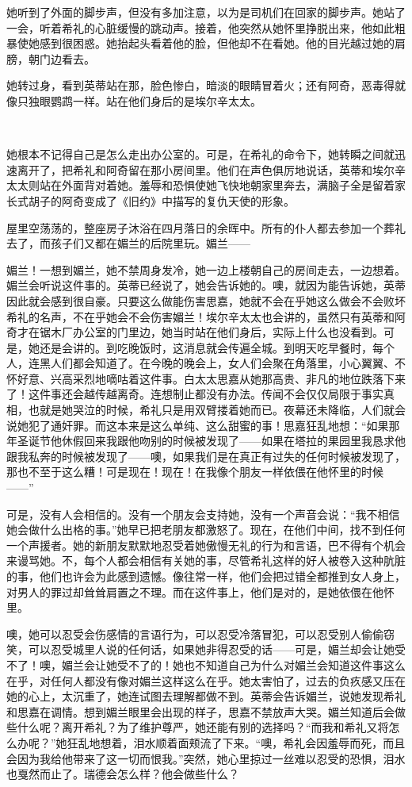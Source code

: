 \par 她听到了外面的脚步声，但没有多加注意，以为是司机们在回家的脚步声。她站了一会，听着希礼的心脏缓慢的跳动声。接着，他突然从她怀里挣脱出来，他如此粗暴使她感到很困惑。她抬起头看着他的脸，但他却不在看她。他的目光越过她的肩膀，朝门边看去。
\par 她转过身，看到英蒂站在那，脸色惨白，暗淡的眼睛冒着火；还有阿奇，恶毒得就像只独眼鹦鹉一样。站在他们身后的是埃尔辛太太。
\par  
\par 她根本不记得自己是怎么走出办公室的。可是，在希礼的命令下，她转瞬之间就迅速离开了，把希礼和阿奇留在那小房间里。他们在声色俱厉地说话，英蒂和埃尔辛太太则站在外面背对着她。羞辱和恐惧使她飞快地朝家里奔去，满脑子全是留着家长式胡子的阿奇变成了《旧约》中描写的复仇天使的形象。
\par 屋里空荡荡的，整座房子沐浴在四月落日的余晖中。所有的仆人都去参加一个葬礼去了，而孩子们又都在媚兰的后院里玩。媚兰——
\par 媚兰！一想到媚兰，她不禁周身发冷，她一边上楼朝自己的房间走去，一边想着。媚兰会听说这件事的。英蒂已经说了，她会告诉她的。噢，就因为能告诉她，英蒂因此就会感到很自豪。只要这么做能伤害思嘉，她就不会在乎她这么做会不会败坏希礼的名声，不在乎她会不会伤害媚兰！埃尔辛太太也会讲的，虽然只有英蒂和阿奇才在锯木厂办公室的门里边，她当时站在他们身后，实际上什么也没看到。可是，她还是会讲的。到吃晚饭时，这消息就会传遍全城。到明天吃早餐时，每个人，连黑人们都会知道了。在今晚的晚会上，女人们会聚在角落里，小心翼翼、不怀好意、兴高采烈地嘀咕着这件事。白太太思嘉从她那高贵、非凡的地位跌落下来了！这件事还会越传越离奇。连想制止都没有办法。传闻不会仅仅局限于事实真相，也就是她哭泣的时候，希礼只是用双臂搂着她而已。夜幕还未降临，人们就会说她犯了通奸罪。而这本来是这么单纯、这么甜蜜的事！思嘉狂乱地想：“如果那年圣诞节他休假回来我跟他吻别的时候被发现了——如果在塔拉的果园里我恳求他跟我私奔的时候被发现了——噢，如果我们是在真正有过失的任何时候被发现了，那也不至于这么糟！可是现在！现在！在我像个朋友一样依偎在他怀里的时候——”
\par 可是，没有人会相信的。没有一个朋友会支持她，没有一个声音会说：“我不相信她会做什么出格的事。”她早已把老朋友都激怒了。现在，在他们中间，找不到任何一个声援者。她的新朋友默默地忍受着她傲慢无礼的行为和言语，巴不得有个机会来谩骂她。不，每个人都会相信有关她的事，尽管希礼这样的好人被卷入这种肮脏的事，他们也许会为此感到遗憾。像往常一样，他们会把过错全都推到女人身上，对男人的罪过却耸耸肩置之不理。而在这件事上，他们是对的，是她依偎在他怀里。
\par 噢，她可以忍受会伤感情的言语行为，可以忍受冷落冒犯，可以忍受别人偷偷窃笑，可以忍受城里人说的任何话，如果她非得忍受的话——可是，媚兰却会让她受不了！噢，媚兰会让她受不了的！她也不知道自己为什么对媚兰会知道这件事这么在乎，对任何人都没有像对媚兰这样这么在乎。她太害怕了，过去的负疚感又压在她的心上，太沉重了，她连试图去理解都做不到。英蒂会告诉媚兰，说她发现希礼和思嘉在调情。想到媚兰眼里会出现的样子，思嘉不禁放声大哭。媚兰知道后会做些什么呢？离开希礼？为了维护尊严，她还能有别的选择吗？“而我和希礼又将怎么办呢？”她狂乱地想着，泪水顺着面颊流了下来。“噢，希礼会因羞辱而死，而且会因为我给他带来了这一切而恨我。”突然，她心里掠过一丝难以忍受的恐惧，泪水也戛然而止了。瑞德会怎么样？他会做些什么？
